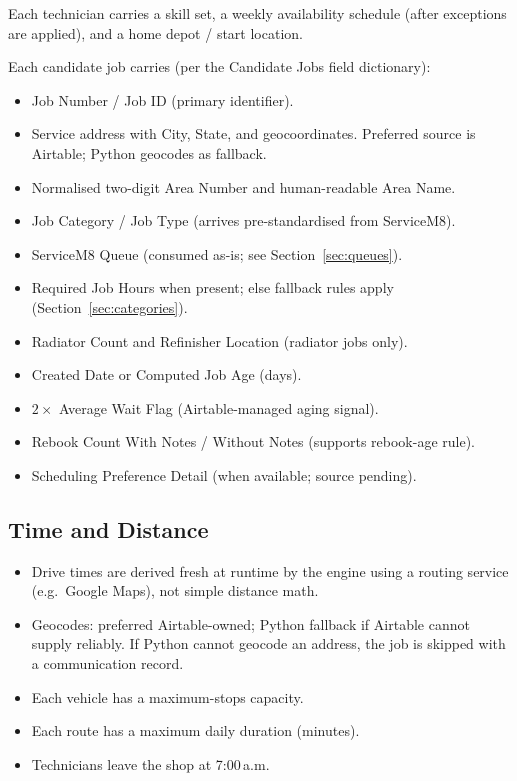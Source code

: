 \documentclass[12pt]{article}
\begin{document}
Each technician carries a skill set, a weekly availability schedule (after exceptions are applied), and a home depot / start location.

Each candidate job carries (per the Candidate Jobs field dictionary):
\begin{itemize}
    \item Job Number / Job ID (primary identifier).
    \item Service address with City, State, and geocoordinates.  Preferred source is Airtable; Python geocodes as fallback.
    \item Normalised two-digit Area Number and human-readable Area Name.
    \item Job Category / Job Type (arrives pre-standardised from ServiceM8).
    \item ServiceM8 Queue (consumed as-is; see Section~\ref{sec:queues}).
    \item Required Job Hours when present; else fallback rules apply (Section~\ref{sec:categories}).
    \item Radiator Count and Refinisher Location (radiator jobs only).
    \item Created Date or Computed Job Age (days).
    \item $2\times$ Average Wait Flag (Airtable-managed aging signal).
    \item Rebook Count With Notes / Without Notes (supports rebook-age rule).
    \item Scheduling Preference Detail (when available; source pending).
\end{itemize}

\subsection*{Time and Distance}
\begin{itemize}
    \item Drive times are derived fresh at runtime by the engine using a routing service (e.g.\ Google Maps), not simple distance math.
    \item Geocodes: preferred Airtable-owned; Python fallback if Airtable cannot supply reliably.  If Python cannot geocode an address, the job is skipped with a communication record.
    \item Each vehicle has a maximum-stops capacity.
    \item Each route has a maximum daily duration (minutes).
    \item Technicians leave the shop at 7:00\,a.m.
\end{itemize}
\end{document}
